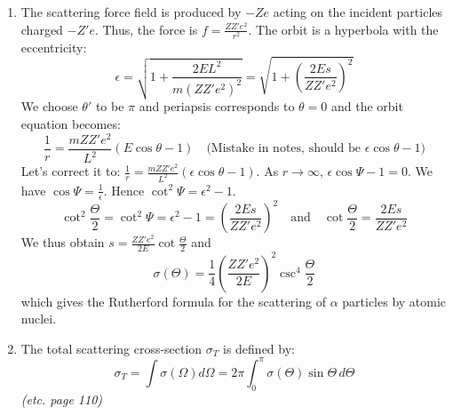 \documentclass{article}
\begin{document}
\begin{enumerate}
		\item The scattering force field is produced by $-Ze$ acting on the incident particles charged $-Z'e$. Thus, the force is $f = \frac{ZZ'e^2}{r^2}$. The orbit is a hyperbola with the eccentricity:
		\[
		\epsilon = \sqrt{1+\frac{2EL^2}{m(ZZ'e^2)^2}} = \sqrt{1+\left(\frac{2Es}{ZZ'e^2}\right)^2}
		\]
		We choose $\theta'$ to be $\pi$ and periapsis corresponds to $\theta=0$ and the orbit equation becomes:
		\[
		\frac{1}{r} = \frac{mZZ'e^2}{L^2}(E\cos\theta-1) \quad \text{(Mistake in notes, should be } \epsilon \cos\theta - 1)
		\]
		Let's correct it to: $\frac{1}{r} = \frac{mZZ'e^2}{L^2}(\epsilon\cos\theta - 1)$. As $r \to \infty$, $\epsilon\cos\Psi-1 = 0$.
		We have $\cos\Psi = \frac{1}{\epsilon}$. Hence $\cot^2\Psi = \epsilon^2 - 1$.
		\[
		\cot^2\frac{\Theta}{2} = \cot^2\Psi = \epsilon^2 - 1 = \left(\frac{2Es}{ZZ'e^2}\right)^2 \quad \text{and} \quad \cot\frac{\Theta}{2} = \frac{2Es}{ZZ'e^2}
		\]
		We thus obtain $s = \frac{ZZ'e^2}{2E}\cot\frac{\Theta}{2}$ and
		\[
		\sigma(\Theta) = \frac{1}{4}\left(\frac{ZZ'e^2}{2E}\right)^2\csc^4\frac{\Theta}{2}
		\]
		which gives the Rutherford formula for the scattering of $\alpha$ particles by atomic nuclei.
		
		\item The total scattering cross-section $\sigma_T$ is defined by:
		\[
		\sigma_T = \int \sigma(\Omega) d\Omega = 2\pi \int_0^\pi \sigma(\Theta) \sin\Theta \, d\Theta
		\]
		\textit{(etc. page 110)}
	\end{enumerate}
	
\end{document}
